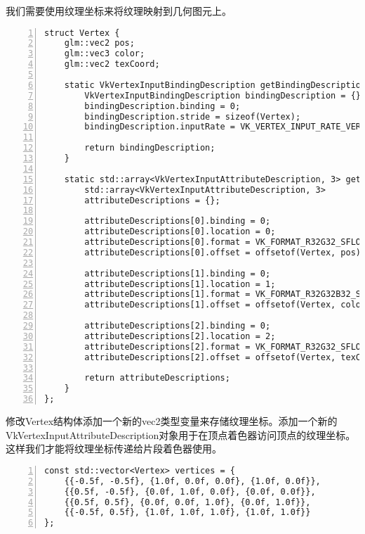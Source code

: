 \documentclass{ctexart}
\begin{document}
我们需要使用纹理坐标来将纹理映射到几何图元上。

\begin{lstlisting}[language={[ANSI]C},keywordstyle=\color{blue!70},commentstyle=\color{red!50!green!50!blue!50},frame=shadowbox, rulesepcolor=\color{red!20!green!20!blue!20},basicstyle=\small,numbers=left, numberstyle=\tiny,breaklines=true]
struct Vertex {
	glm::vec2 pos;
	glm::vec3 color;
	glm::vec2 texCoord;

	static VkVertexInputBindingDescription getBindingDescription() {
		VkVertexInputBindingDescription bindingDescription = {};
		bindingDescription.binding = 0;
		bindingDescription.stride = sizeof(Vertex);
		bindingDescription.inputRate = VK_VERTEX_INPUT_RATE_VERTEX;

		return bindingDescription;
	}

	static std::array<VkVertexInputAttributeDescription, 3> getAttributeDescriptions() {
		std::array<VkVertexInputAttributeDescription, 3>
		attributeDescriptions = {};

		attributeDescriptions[0].binding = 0;
		attributeDescriptions[0].location = 0;
		attributeDescriptions[0].format = VK_FORMAT_R32G32_SFLOAT;
		attributeDescriptions[0].offset = offsetof(Vertex, pos);

		attributeDescriptions[1].binding = 0;
		attributeDescriptions[1].location = 1;
		attributeDescriptions[1].format = VK_FORMAT_R32G32B32_SFLOAT;
		attributeDescriptions[1].offset = offsetof(Vertex, color);

		attributeDescriptions[2].binding = 0;
		attributeDescriptions[2].location = 2;
		attributeDescriptions[2].format = VK_FORMAT_R32G32_SFLOAT;
		attributeDescriptions[2].offset = offsetof(Vertex, texCoord);

		return attributeDescriptions;
	}
};
\end{lstlisting}

修改Vertex结构体添加一个新的vec2类型变量来存储纹理坐标。添加一个新的VkVertexInputAttributeDescription对象用于在顶点着色器访问顶点的纹理坐标。这样我们才能将纹理坐标传递给片段着色器使用。

\begin{lstlisting}[language={[ANSI]C},keywordstyle=\color{blue!70},commentstyle=\color{red!50!green!50!blue!50},frame=shadowbox, rulesepcolor=\color{red!20!green!20!blue!20},basicstyle=\small,numbers=left, numberstyle=\tiny,breaklines=true]
const std::vector<Vertex> vertices = {
	{{-0.5f, -0.5f}, {1.0f, 0.0f, 0.0f}, {1.0f, 0.0f}},
	{{0.5f, -0.5f}, {0.0f, 1.0f, 0.0f}, {0.0f, 0.0f}},
	{{0.5f, 0.5f}, {0.0f, 0.0f, 1.0f}, {0.0f, 1.0f}},
	{{-0.5f, 0.5f}, {1.0f, 1.0f, 1.0f}, {1.0f, 1.0f}}
};
\end{lstlisting}
\end{document}
